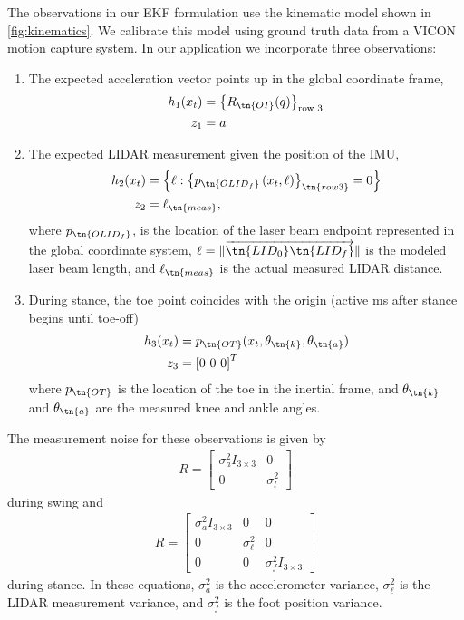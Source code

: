 The observations in our EKF formulation use the kinematic model shown in
\cref{fig:kinematics}. We calibrate this model using ground truth data from a
VICON motion capture system. In our application we incorporate three
observations:
\begin{enumerate}
\item The expected acceleration vector points up in the global coordinate frame,
\begin{align} 
    h_1(x_t) &= {\left\{R_\tn{OI}(q) \right\}}_\textrm{row 3} \\
    z_1 &= a
\end{align}

\item The expected LIDAR measurement given the position of the IMU,
\begin{align}
    h_2(x_t) &= \left\{\ell : \left\{ p_\tn{OLID_f}\left(x_t, \ell \right)
        \right\}_\tn{row 3} = 0\right\} \\
    z_2 &= \ell_\tn{meas},
\end{align}
where $p_\tn{OLID_f}$, is the location of the laser beam endpoint represented in
the global coordinate system, $\ell = \lVert
\overrightarrow{\tn{LID_0}\tn{LID_f}} \rVert$ is the modeled laser beam length,
and $\ell_\tn{meas}$ is the actual measured LIDAR distance.

\item During stance, the toe point coincides with the origin (active
\unit[200]{ms} after stance begins until toe-off)
\begin{align}
    h_3(x_t) &= p_\tn{OT}(x_t, \theta_\tn{k}, \theta_\tn{a}) \\
    z_3 &= {[0 \ 0 \ 0]}^T
\end{align}
where $p_\tn{OT}$ is the location of the toe in the inertial frame, and
$\theta_\tn{k}$ and $\theta_\tn{a}$ are the measured knee and ankle angles.
\end{enumerate}

The measurement noise for these observations is given by
\begin{align}
    R = \begin{bmatrix} \sigma_a^2 I_{3\times3} & 0 \\
        0 & \sigma_l^2 \end{bmatrix}
\end{align}
during swing and
\begin{align}
    R = \begin{bmatrix} \sigma_a^2 I_{3\times3} & 0 & 0 \\
        0 & \sigma_\ell^2 & 0 \\
        0 & 0 & \sigma_f^2 I_{3\times3} \end{bmatrix}
\end{align}
during stance. In these equations, $\sigma_a^2$ is the accelerometer variance,
$\sigma_\ell^2$ is the LIDAR measurement variance, and $\sigma_f^2$ is the foot
position variance.


